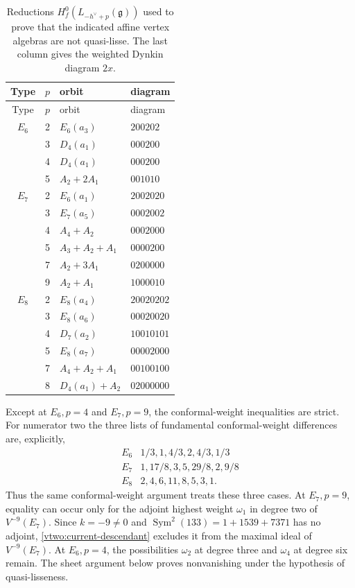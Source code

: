 \documentclass[11pt,a4paper]{amsart}
\numberwithin{equation}{section}
\theoremstyle{definition}
\theoremstyle{remark}
\newcommand{\g}{\mathfrak g}
\newcommand{\Sym}{\operatorname{Sym}}
\begin{document}
\begin{longtable}{@{}ccll@{}}
\caption{Reductions $H_f^0(L_{-h^\vee+p}(\g))$ used to prove that the indicated affine vertex algebras are not quasi-lisse. The last column gives the weighted Dynkin diagram $2x$.}
\label{exc:negative-diagrams}\\\toprule
Type&$p$&orbit&diagram\\\midrule\endfirsthead
\toprule Type&$p$&orbit&diagram\\\midrule\endhead
$E_6$&2&$E_6(a_3)$&$200202$\\
&3&$D_4(a_1)$&$000200$\\
&4&$D_4(a_1)$&$000200$\\
&5&$A_2+2A_1$&$001010$\\ \midrule
$E_7$&2&$E_6(a_1)$&$2002020$\\
&3&$E_7(a_5)$&$0002002$\\
&4&$A_4+A_2$&$0002000$\\
&5&$A_3+A_2+A_1$&$0000200$\\
&7&$A_2+3A_1$&$0200000$\\
&9&$A_2+A_1$&$1000010$\\ \midrule
$E_8$&2&$E_8(a_4)$&$20020202$\\
&3&$E_8(a_6)$&$00020020$\\
&4&$D_7(a_2)$&$10010101$\\
&5&$E_8(a_7)$&$00002000$\\
&7&$A_4+A_2+A_1$&$00100100$\\
&8&$D_4(a_1)+A_2$&$02000000$\\\bottomrule
\end{longtable}
Except at $E_6,p=4$ and $E_7,p=9$, the conformal-weight inequalities are strict.
For numerator two the three lists of fundamental conformal-weight differences are, explicitly,
$$
\begin{array}{c|l}
E_6&1/3,1,4/3,2,4/3,1/3\\
E_7&1,17/8,3,5,29/8,2,9/8\\
E_8&2,4,6,11,8,5,3,1.
\end{array}
$$
Thus the same conformal-weight argument treats these three cases. At $E_7,p=9$,
equality can occur only for the adjoint highest weight $\omega_1$
in degree two of $V^{-9}(E_7)$.
Since $k=-9\ne0$ and $\Sym^2(133)=1+1539+7371$ has no adjoint,
\cref{vtwo:current-descendant} excludes it from the maximal ideal of
$V^{-9}(E_7)$.
At $E_6,p=4$, the possibilities $\omega_2$ at degree three and
$\omega_4$ at degree six remain. The sheet argument below proves
nonvanishing under the hypothesis of quasi-lisseness.
\end{document}
